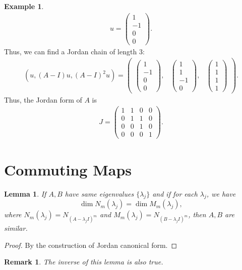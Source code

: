 \documentclass[11pt]{book}
\newtheorem{lemma}[theorem]{Lemma}
\newtheorem{remark}{Remark}[section]
\theoremstyle{definition}
\newtheorem{example}{Example}[section]
\numberwithin{equation}{subsection}
\begin{document}
\begin{example}
\begin{align*}
    u = \begin{pmatrix}
    1 \\
    -1 \\
    0 \\
    0
    \end{pmatrix}.
\end{align*}
Thus, we can find a Jordan chain of length $3$:
\begin{align*}
    (u, (A-I)u,(A-I)^2u) = 
    \begin{pmatrix}
        \begin{pmatrix}1 \\ -1 \\ 0 \\ 0 \end{pmatrix}, & 
        \begin{pmatrix}1 \\ 1 \\ -1 \\ 0 \end{pmatrix}, & 
        \begin{pmatrix}1 \\ 1 \\ 1 \\ 1 \end{pmatrix}
    \end{pmatrix}.
\end{align*}
Thus, the Jordan form of $A$ is 
\begin{align*}
    J = \begin{pmatrix}
    1 & 1 & 0 & 0 \\
    0 & 1 & 1 & 0 \\
    0 & 0 & 1 & 0 \\
    0 & 0 & 0 & 1
    \end{pmatrix}.
\end{align*}
\end{example}

\medskip

\section{Commuting Maps}
\begin{lemma}
If $A,B$ have same eigenvalues $\{\lambda_j\}$ and if for each $\lambda_j$, we have
$$\dim N_m(\lambda_j) = \dim M_m(\lambda_j),$$
where $N_m(\lambda_j) = N_{(A - \lambda_j I)^m}$ and $M_m(\lambda_j) = N_{(B - \lambda_j I)^m}$, then $A, B$ are similar.
\end{lemma}
\begin{proof}
By the construction of Jordan canonical form.
\end{proof}
\begin{remark}
The inverse of this lemma is also true.
\end{remark}
\end{document}
